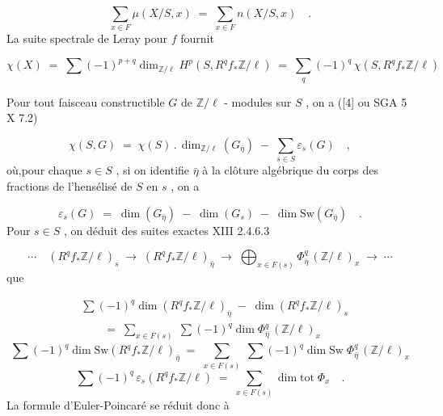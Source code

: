 \begin{equation*}
\sum_{x \in F} \mu(X/S,x) \; = \; \sum_{x \in F} n(X/S,x) \quad .
\end{equation*}
La suite spectrale de Leray pour $f$ fournit

\begin{equation*}
\chi(X) \; = \; \sum (-1)^{p+q} \dim_{\mathbb{Z}/\ell} H^p(S,R^q f_* \mathbb{Z}/\ell) \; = \; \sum_q (-1)^q \, \chi(S,R^q f_* \mathbb{Z}/\ell)
\end{equation*}


Pour tout faisceau constructible $G$ de $\mathbb{Z}/\ell$ - modules sur $S$ , on a ([4] ou SGA 5 X 7.2)

\begin{equation*}
\chi(S,G) \; = \; \chi(S) \, . \, \dim_{\mathbb{Z}/\ell}(G_{\bar{\eta}}) \; - \; \sum_{s \in S} \varepsilon_s(G) \quad ,
\end{equation*}
où,pour chaque $s \in S$ , si on identifie $\bar{\eta}$ à la clôture algébrique du corps des fractions de l'hensélisé de $S$ en $s$ , on a

\begin{equation*}
\varepsilon_s(G) \; = \; \dim(G_{\bar{\eta}}) \; - \; \dim(G_s) \; - \; \dim \mathrm{Sw}(G_{\bar{\eta}}) \quad .
\end{equation*}
Pour $s \in S$ , on déduit des suites exactes XIII 2.4.6.3

\begin{equation*}
\cdots \quad (R^q f_* \mathbb{Z}/\ell)_s \; \longrightarrow \; (R^q f_* \mathbb{Z}/\ell)_{\bar{\eta}} \; \longrightarrow \; \bigoplus_{x \in F(s)} \Phi^q_{\bar{\eta}} \, (\mathbb{Z}/\ell)_x \; \longrightarrow \; \cdots
\end{equation*}
que

\begin{equation*}\tag{a}
\begin{aligned} &\sum (-1)^q \dim(R^q f_* \mathbb{Z}/\ell)_{\bar{\eta}} \; - \; \dim(R^q f_* \mathbb{Z}/\ell)_s \\[1ex] &\qquad = \; \sum_{x \in F(s)} \; \sum (-1)^q \dim \Phi^q_{\bar{\eta}} \, (\mathbb{Z}/\ell)_x \end{aligned}
\end{equation*}
\begin{equation*}\tag{b}
\sum (-1)^q \dim \mathrm{Sw}(R^q f_* \mathbb{Z}/\ell)_{\bar{\eta}} \; = \; \sum_{x \in F(s)} \; \sum (-1)^q \dim \mathrm{Sw} \; \Phi^q_{\bar{\eta}} \, (\mathbb{Z}/\ell)_x
\end{equation*}
\begin{equation}\tag{c}
\sum (-1)^q \, \varepsilon_s(R^q f_* \mathbb{Z}/\ell) \; = \; \sum_{x \in F(s)} \dim \mathrm{tot} \; \Phi_x \quad .
\end{equation}
La formule d'Euler-Poincaré se réduit donc à

